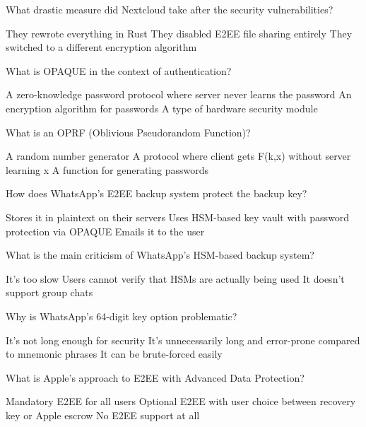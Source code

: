 \documentclass[10pt,a4paper,american]{exam}
\begin{document}
\begin{questions}
	\question What drastic measure did Nextcloud take after the security vulnerabilities?
	\begin{randomizechoices}
		\choice They rewrote everything in Rust
		\CorrectChoice They disabled E2EE file sharing entirely
		\choice They switched to a different encryption algorithm
	\end{randomizechoices}

	\question What is OPAQUE in the context of authentication?
	\begin{randomizechoices}
		\CorrectChoice A zero-knowledge password protocol where server never learns the password
		\choice An encryption algorithm for passwords
		\choice A type of hardware security module
	\end{randomizechoices}

	\question What is an OPRF (Oblivious Pseudorandom Function)?
	\begin{randomizechoices}
		\choice A random number generator
		\CorrectChoice A protocol where client gets F(k,x) without server learning x
		\choice A function for generating passwords
	\end{randomizechoices}

	\question How does WhatsApp's E2EE backup system protect the backup key?
	\begin{randomizechoices}
		\choice Stores it in plaintext on their servers
		\CorrectChoice Uses HSM-based key vault with password protection via OPAQUE
		\choice Emails it to the user
	\end{randomizechoices}

	\question What is the main criticism of WhatsApp's HSM-based backup system?
	\begin{randomizechoices}
		\choice It's too slow
		\CorrectChoice Users cannot verify that HSMs are actually being used
		\choice It doesn't support group chats
	\end{randomizechoices}

	\question Why is WhatsApp's 64-digit key option problematic?
	\begin{randomizechoices}
		\choice It's not long enough for security
		\CorrectChoice It's unnecessarily long and error-prone compared to mnemonic phrases
		\choice It can be brute-forced easily
	\end{randomizechoices}

	\question What is Apple's approach to E2EE with Advanced Data Protection?
	\begin{randomizechoices}
		\choice Mandatory E2EE for all users
		\CorrectChoice Optional E2EE with user choice between recovery key or Apple escrow
		\choice No E2EE support at all
	\end{randomizechoices}


\end{questions}
\end{document}
